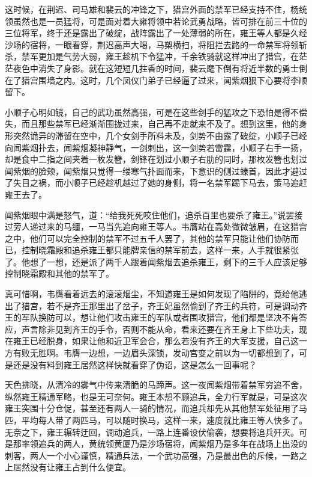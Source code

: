 这时候，在荆迟、司马雄和裴云的冲锋之下，猎宫外面的禁军已经支持不住，杨统领虽然也是一员猛将，可是面对着大雍将领中若论武勇战略，皆可排在前三十位的三位将军，终于还是露出了破绽，战阵露出了一处薄弱的所在，雍王等人都是久经沙场的宿将，一眼看穿，荆迟高声大喝，马槊横扫，将阻拦去路的一命禁军将领斩杀，禁军更加是气势大弱，雍王趁机下令猛冲，千余铁骑就这样冲出了猎宫，在茫茫夜色中消失了身影。就在这短短几拄香的时间，裴云麾下倒有将近半数的勇士倒在了猎宫围墙之内。这时，几个凤仪门弟子已经逼了过来，闻紫烟狠下心要将李顺留下。

小顺子心明如镜，自己的武功虽然高强，可是在这些剑手的猛攻之下恐怕是得不偿失，而且那些禁军已经渐渐围拢过来，自己再不走就来不及了。想到这里，他的身形突然诡异的滞留在空中，几个女剑手所料未及，剑势不由露了破绽，小顺子已经向闻紫烟扑去，闻紫烟凝神静气，一剑刺出，这一剑势若雷霆，小顺子右手一扬，却是食中二指之间夹着一枚发簪，剑锋在划过小顺子右肋的同时，那枚发簪也划过闻紫烟的脸颊，闻紫烟只觉得一缕寒气扑面而来，下意识的侧过螓首，因此才避过了失目之祸，而小顺子已经趁机越过了她的身侧，将一名禁军踢下马去，策马追赶雍王去了。

闻紫烟眼中满是怒气，道：“给我死死咬住他们，追杀百里也要杀了雍王。”说罢接过旁人递过来的马缰，一马当先追向雍王等人。韦膺站在高处微微皱眉，在这猎宫之中，他们可以完全控制的禁军不过五千人罢了，其他的禁军只能让他们协防而已，控制晓霜殿和追杀雍王都只能牌亲信的禁军前去，这样一来，人手就很紧张了。他想了一想，还是派了两千人跟着闻紫烟去追杀雍王，剩下的三千人应该足够控制晓霜殿和其他的禁军了。

真可惜啊，韦膺看着远去的滚滚烟尘，不知道雍王是如何发现了陷阱的，竟给他逃出了猎宫，若不是齐王那里出了岔子，齐王妃虽然偷到了齐王的兵符，可是调动齐王的军队换防可以，想让他们攻击雍王的军队或者围攻猎宫，他们都是坚决不肯答应，声言除非见到齐王的手令，否则不能从命，看来还要在齐王身上下些功夫，现在雍王已经脱身，如果让他和近卫军会合，那么若没有齐王的大军支援，自己这一方有败无胜啊。韦膺一边想，一边眉头深锁，发动宫变之前以为一切都想到了，可是还是没有料到雍王居然这样快就看穿了伪诏，这是怎么一回事呢？

天色拂晓，从清冷的雾气中传来清脆的马蹄声。这一夜闻紫烟带着禁军穷追不舍，纵然雍王精通军略，也是无可奈何。雍王本想不顾追兵，全力行军就是，可是这次雍王突围十分仓促，甚至还有两人一骑的情况，而追兵却先从其他禁军处征用了马匹，平均每人带了两匹马，可以随时换马，这样一来，速度就比雍王等人快多了。无奈之下，雍王辗转迂回，调动追兵，一路上连番设伏偷袭，想要将追兵歼灭。可是那率领追兵的两人，黄统领黄厦乃是沙场宿将，闻紫烟乃是多年在战场上出没的刺客，两人一个小心谨慎，精通兵法，一个武功高强，乃是最出色的斥候，一路之上居然没有让雍王占到什么便宜。

